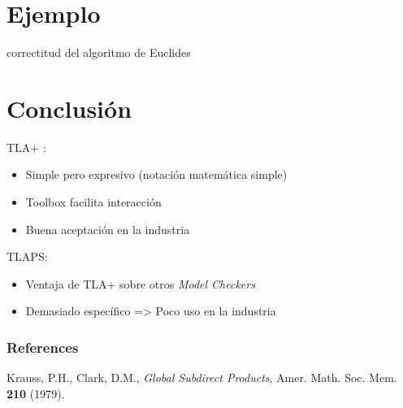 \documentclass[12pt]{beamer}
\begin{document}
\section{Ejemplo}
\begin{frame}
correctitud del algoritmo de Euclides
\end{frame}

\section{Conclusión}
\begin{frame}
  TLA+ : 
  	   \begin{itemize}
	    \item Simple pero expresivo (notación matemática simple)
	    \item Toolbox facilita interacción
	    \item Buena aceptación en la industria
	   \end{itemize}
  TLAPS: 
    	   \begin{itemize}
	    \item Ventaja de TLA+ sobre otros \textit{Model Checkers}
	    \item Demasiado específico => Poco uso en la industria
	   \end{itemize}
  
\end{frame}



\begin{frame}%
\frametitle{References}

\begin{thebibliography}{CamVag2009}

{}\textrm{Krauss, P.H., Clark, D.M.}, 
\textit{Global Subdirect Products}, Amer. Math. Soc. Mem. \textbf{210} (1979).


\end{thebibliography}

\end{frame}

\begin{frame}
\begin{figure}[center]
\end{figure}
\end{frame}
\end{document}
